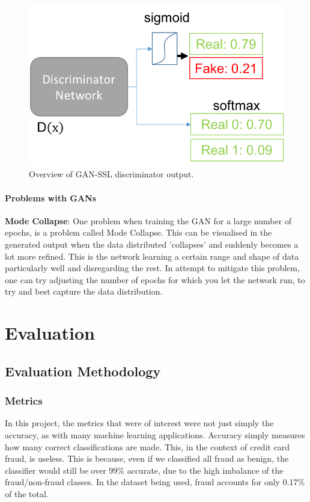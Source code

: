 \documentclass[12pt,a4paper,twoside]{report}
\begin{document}
\begin{figure}[H]
\centering
\includegraphics[scale=0.8]{gan-ssl}
\caption{Overview of GAN-SSL discriminator output.}
\label{fig:gan-ssl}
\end{figure}

\subsubsection{Problems with GANs}

\textbf{Mode Collapse}: One problem when training the GAN for a large number of epochs, is a problem called Mode Collapse. This can be visualised in the generated output when the data distributed 'collapses' and suddenly becomes a lot more refined. This is the network learning a certain range and shape of data particularly well and disregarding the rest. In attempt to mitigate this problem, one can try adjusting the number of epochs for which you let the network run, to try and best capture the data distribution. 


\chapter{Evaluation}
\section{Evaluation Methodology}
\subsection{Metrics}
In this project, the metrics that were of interest were not just simply the accuracy, as with many machine learning applications. Accuracy simply measures how many correct classifications are made. This, in the context of credit card fraud, is useless. This is because, even if we classified all fraud as benign, the classifier would still be over 99\% accurate, due to the high imbalance of the fraud/non-fraud classes. In the dataset being used, fraud accounts for only 0.17\% of the total. 
\end{document}
